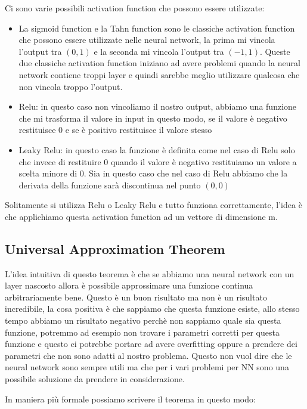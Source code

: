 \documentclass[14pt]{extreport}
\begin{document}
Ci sono varie possibili activation function che possono essere utilizzate:
\begin{itemize}
\item La sigmoid function e la Tahn function sono le classiche activation function che possono essere utilizzate nelle neural network, la prima mi
vincola l'output tra $(0,1)$ e la seconda mi vincola l'output tra $(-1,1)$. Queste due classiche activation function iniziano ad avere problemi quando
la neural network contiene troppi layer e quindi sarebbe meglio utilizzare qualcosa che non vincola troppo l'output.
\item Relu: in questo caso non vincoliamo il nostro output, abbiamo una funzione che mi trasforma il valore in input in questo modo, se il valore è
negativo restituisce 0 e se è positivo restituisce il valore stesso
\item Leaky Relu: in questo caso la funzione è definita come nel caso di Relu solo che invece di restituire 0 quando il valore è negativo restituiamo
un valore a scelta minore di 0. Sia in questo caso che nel caso di Relu abbiamo che la derivata della funzione sarà discontinua nel punto $(0,0)$
\end{itemize}

Solitamente si utilizza Relu o Leaky Relu e tutto funziona correttamente, l'idea è che applichiamo questa activation function ad un vettore di
dimensione m.

\subsection{Universal Approximation Theorem}

L'idea intuitiva di questo teorema è che se abbiamo una neural network con un layer nascosto allora è possibile approssimare una funzione continua
arbitrariamente bene. Questo è un buon risultato ma non è un risultato incredibile, la cosa positiva è che sappiamo che questa funzione esiste, allo
stesso tempo abbiamo un risultato negativo perchè non sappiamo quale sia questa funzione, potremmo ad esempio non trovare i parametri corretti per
questa funzione e questo ci potrebbe portare ad avere overfitting oppure a prendere dei parametri che non sono adatti al nostro problema. Questo non
vuol dire che le neural network sono sempre utili ma che per i vari problemi per NN sono una possibile soluzione da prendere in considerazione.

In maniera più formale possiamo scrivere il teorema in questo modo:
\end{document}
